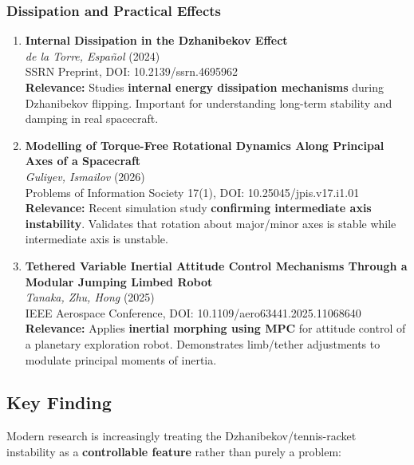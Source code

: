 \documentclass[11pt]{article}
\begin{document}
\subsubsection{Dissipation and Practical Effects}

\begin{enumerate}[label=\textbf{\arabic*.},resume]
    \item \textbf{Internal Dissipation in the Dzhanibekov Effect}\\
    \textit{de la Torre, Espa\~{n}ol} (2024)\\
    SSRN Preprint, DOI: 10.2139/ssrn.4695962\\
    \textbf{Relevance:} Studies \textbf{internal energy dissipation mechanisms} during Dzhanibekov flipping. Important for understanding long-term stability and damping in real spacecraft.

    \item \textbf{Modelling of Torque-Free Rotational Dynamics Along Principal Axes of a Spacecraft}\\
    \textit{Guliyev, Ismailov} (2026)\\
    Problems of Information Society 17(1), DOI: 10.25045/jpis.v17.i1.01\\
    \textbf{Relevance:} Recent simulation study \textbf{confirming intermediate axis instability}. Validates that rotation about major/minor axes is stable while intermediate axis is unstable.

    \item \textbf{Tethered Variable Inertial Attitude Control Mechanisms Through a Modular Jumping Limbed Robot}\\
    \textit{Tanaka, Zhu, Hong} (2025)\\
    IEEE Aerospace Conference, DOI: 10.1109/aero63441.2025.11068640\\
    \textbf{Relevance:} Applies \textbf{inertial morphing using MPC} for attitude control of a planetary exploration robot. Demonstrates limb/tether adjustments to modulate principal moments of inertia.
\end{enumerate}

\subsection{Key Finding}
Modern research is increasingly treating the Dzhanibekov/tennis-racket instability as a \textbf{controllable feature} rather than purely a problem:
\end{document}
